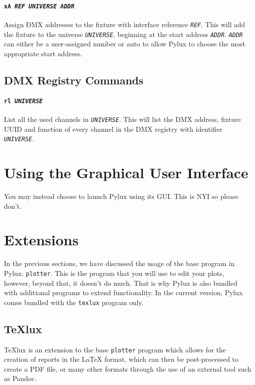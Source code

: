 \documentclass[a4paper]{article}
\begin{document}
\paragraph{\texttt{xA \textit{REF UNIVERSE ADDR}}}
Assign DMX addresses to the fixture with interface reference 
\texttt{\textit{REF}}. This will add the fixture to the universe 
\texttt{\textit{UNIVERSE}}, beginning at the start address 
\texttt{\textit{ADDR}}. \texttt{\textit{ADDR}} can either be a user-assigned 
number or auto to allow Pylux to choose the most appropriate start address.

\subsection{DMX Registry Commands}

\paragraph{\texttt{rl \textit{UNIVERSE}}}
List all the used channels in \texttt{\textit{UNIVERSE}}. This will list the 
DMX address, fixture UUID and function of every channel in the DMX registry 
with identifier \texttt{\textit{UNIVERSE}}.

\section{Using the Graphical User Interface}
You may instead choose to launch Pylux using its GUI. This is NYI so please 
don't.

\section{Extensions}
In the previous sections, we have discussed the usage of the base program in 
Pylux: \texttt{plotter}. This is the program that you will use to edit your
plots, however, beyond that, it doesn't do much. That is why Pylux is also 
bundled with additional programs to extend functionality. In the current 
version, Pylux comes bundled with the \texttt{texlux} program only.

\subsection{TeXlux}
TeXlux is an extension to the base \texttt{plotter} program which allows for 
the creation of reports in the \LaTeX{} format, which can then be 
post-processed to create a PDF file, or many other formats through the use of 
an external tool such as Pandoc.
\end{document}
